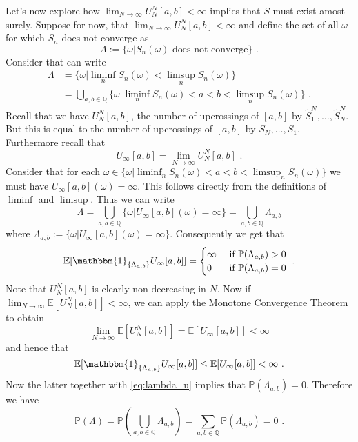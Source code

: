 \documentclass[phd]{UWMThesis}
\renewcommand{\P}{\mathbb{P}}
\newcommand{\E}{\mathbb{E}}
\newcommand{\StN}[1]{\tilde{S}_{#1}^N}
\newcommand{\UNab}[1]{U_{#1}^N[a,b]}
\newcommand{\I}[1]{{\mathbbm{1}_{\{#1\}}}}
\newcommand{\mdot}{\textrm{ .}}
\renewcommand{\.}{\textrm{ .}}
\theoremstyle{definition}
\numberwithin{thm}{chapter}
\begin{document}
%
Let's now explore how $\lim_{N\to\infty}\UNab{N}<\infty$ implies that $S$ must exist amost surely. Suppose for now, that $\lim_{N\to\infty}\UNab{N}<\infty$ and define the set of all $\omega$ for which $S_n$ does not converge as
$$\Lambda := \{\omega | S_n(\omega) \textrm{ does not converge}\}\mdot$$
%
Consider that can write
\begin{align*}
\Lambda &= \{\omega | \liminf_{n}S_n(\omega) < \limsup_{n} S_n(\omega)\}\\
&= \bigcup_{a,b\in\mathbb{Q}}\{\omega | \liminf_{n}S_n(\omega) < a < b < \limsup_{n} S_n(\omega)\}\mdot
\end{align*}
%  
Recall that we have $\UNab{N}$, the number of upcrossings of $[a,b]$ by $\StN{1}, \dots, \StN{N}$. But this is equal to the number of upcrossings of $[a,b]$ by $S_N, \dots, S_1$. Furthermore recall that 
$$U_\infty[a,b] = \lim\limits_{N\to\infty} \UNab{N}\mdot$$
%
Consider that for each $\omega \in \{\omega | \liminf_{n}S_n(\omega) < a < b < \limsup_{n} S_n(\omega)\}$ we must have $U_{\infty}[a,b](\omega) = \infty$. This follows directly from the definitions of $\liminf$ and $\limsup$. Thus we can write
\begin{equation*}
\Lambda = \bigcup_{a,b\in\mathbb{Q}}\{ \omega | U_\infty[a,b](\omega) = \infty\} = \bigcup_{a,b\in\mathbb{Q}} \Lambda_{a,b}
\end{equation*}
where $\Lambda_{a,b} := \{ \omega | U_\infty[a,b](\omega) = \infty\}$.
%
Consequently we get that
\begin{equation}
\E[\I{\Lambda_{a,b}} U_\infty[a,b]] = \begin{cases}
\infty &\textrm{ if } \P(\Lambda_{a,b})>0\\
0 &\textrm{ if } \P(\Lambda_{a,b})=0\\
\end{cases}\mdot
\label{eq:lambda_u}
\end{equation}
%
Note that $\UNab{N}$ is clearly non-decreasing in $N$. Now if $\lim_{N\to\infty}\E[\UNab{N}]<\infty$, we can apply the Monotone Convergence Theorem  to obtain
$$\lim\limits_{N\to\infty}\E[\UNab{N}] = \E[U_\infty[a,b]] <\infty$$	
%	
and hence that
$$\E[\I{\Lambda_{a,b}} U_\infty[a,b]] \leq \E[U_\infty[a,b]] < \infty\mdot$$
%
Now the latter together with \eqref{eq:lambda_u} implies that $\P(\Lambda_{a,b}) = 0$. Therefore we have
\begin{equation*}
\P(\Lambda) = \P\left(\bigcup_{a,b\in\mathbb{Q}}\Lambda_{a,b}\right) = \sum_{a,b \in \mathbb{Q}} \P(\Lambda_{a,b}) = 0 \mdot
\end{equation*}
\end{document}
